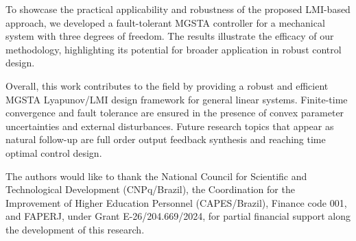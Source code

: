 \documentclass[twocolumn]{autarc_LH}
\begin{document}
To showcase the practical applicability and robustness of the proposed LMI-based approach, we developed a fault-tolerant MGSTA controller for a mechanical system with three degrees of freedom. The results illustrate the efficacy of our methodology, highlighting its potential for broader application in robust control design.

Overall, this work contributes to the field by providing a robust and efficient MGSTA Lyapunov/LMI design framework for general linear systems. Finite-time convergence and fault tolerance are ensured in the presence of convex  parameter uncertainties and external disturbances. Future research topics that appear as natural follow-up are full order output feedback synthesis and reaching time optimal control design.
 
\balance 
 
\begin{ack}                               
The authors would like to thank the National Council for Scientific and Technological Development (CNPq/Brazil), the Coordination for the Improvement of Higher Education Personnel (CAPES/Brazil), Finance code 001, and FAPERJ, under Grant E-26/204.669/2024, for partial financial support along the development of this research.
\end{ack}

         
           
\end{document}
